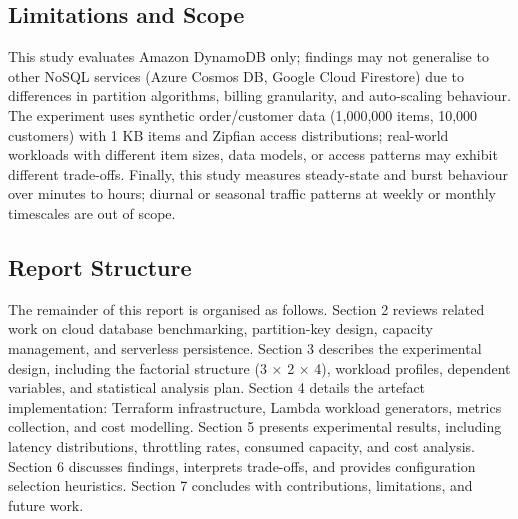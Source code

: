\subsection{Limitations and Scope}

This study evaluates Amazon DynamoDB only; findings may not generalise to other NoSQL services (Azure Cosmos DB, Google Cloud Firestore) due to differences in partition algorithms, billing granularity, and auto-scaling behaviour. The experiment uses synthetic order/customer data (1,000,000 items, 10,000 customers) with 1 KB items and Zipfian access distributions; real-world workloads with different item sizes, data models, or access patterns may exhibit different trade-offs. Finally, this study measures steady-state and burst behaviour over minutes to hours; diurnal or seasonal traffic patterns at weekly or monthly timescales are out of scope.

\subsection{Report Structure}

The remainder of this report is organised as follows. Section 2 reviews related work on cloud database benchmarking, partition-key design, capacity management, and serverless persistence. Section 3 describes the experimental design, including the factorial structure (3 × 2 × 4), workload profiles, dependent variables, and statistical analysis plan. Section 4 details the artefact implementation: Terraform infrastructure, Lambda workload generators, metrics collection, and cost modelling. Section 5 presents experimental results, including latency distributions, throttling rates, consumed capacity, and cost analysis. Section 6 discusses findings, interprets trade-offs, and provides configuration selection heuristics. Section 7 concludes with contributions, limitations, and future work.
